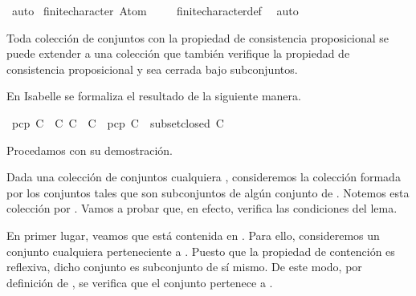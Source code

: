 \begin{isabellebody}
\ auto%
\endisatagproof
{\isafoldproof}%
%
\isadelimproof
\isanewline
%
\endisadelimproof
\isanewline
{}\isamarkupfalse%
\ {\isachardoublequoteopen}finite{\isacharunderscore}character\ {\isacharbraceleft}{\isacharbraceleft}Atom\ {}{\isacharbraceright}{\isacharcomma}{\isacharbraceleft}{\isacharbraceright}{\isacharbraceright}{\isachardoublequoteclose}\isanewline
%
\isadelimproof
\ \ %
\endisadelimproof
%
\isatagproof
{}\isamarkupfalse%
\ finite{\isacharunderscore}character{\isacharunderscore}def\ \isamarkupfalse%
\ auto%
\endisatagproof
{\isafoldproof}%
%
\isadelimproof
%
\endisadelimproof
%
\begin{isamarkuptext}%
\begin{lema}
    Toda colección de conjuntos con la propiedad de consistencia proposicional se puede extender a
    una colección que también verifique la propiedad de consistencia proposicional y sea cerrada 
    bajo subconjuntos.
  \end{lema}

  En Isabelle se formaliza el resultado de la siguiente manera.%
\end{isamarkuptext}\isamarkuptrue%
\isamarkupfalse%
\ {\isachardoublequoteopen}pcp\ C\ {\isasymLongrightarrow}\ {\isasymexists}C{\isacharprime}{\isachardot}\ C\ {\isasymsubseteq}\ C{\isacharprime}\ {\isasymand}\ pcp\ C{\isacharprime}\ {\isasymand}\ subset{\isacharunderscore}closed\ C{\isacharprime}{\isachardoublequoteclose}\isanewline
%
\isadelimproof
\ \ %
\endisadelimproof
%
\isatagproof
{}\isamarkupfalse%
%
\endisatagproof
{\isafoldproof}%
%
\isadelimproof
%
\endisadelimproof
%
\begin{isamarkuptext}%
Procedamos con su demostración.

\begin{demostracion}
  Dada una colección de conjuntos cualquiera , consideremos la colección formada por los 
  conjuntos tales que son subconjuntos de algún conjunto de . Notemos esta colección por 
  . Vamos a probar que, en efecto,  verifica  las condiciones del lema.

  En primer lugar, veamos que  está contenida en . Para ello, consideremos un conjunto
  cualquiera perteneciente a . Puesto que la propiedad de contención es reflexiva, dicho conjunto 
  es subconjunto de sí mismo. De este modo, por definición de , se verifica que el conjunto 
  pertenece a .


\end{demostracion}
\end{isamarkuptext}
\end{isabellebody}
